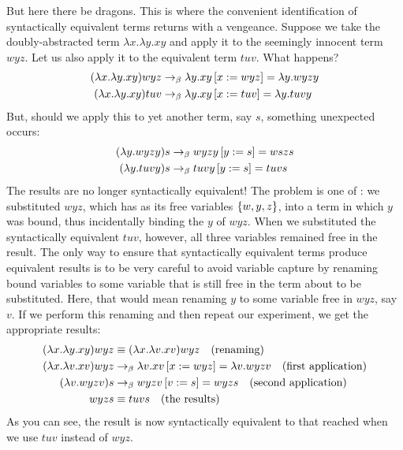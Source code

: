 But here there be dragons. This is where the convenient identification of syntactically equivalent terms returns with a vengeance. Suppose we take the doubly-abstracted term $\lambda x. \lambda y. xy$ and apply it to the seemingly innocent term $wyz$. Let us also apply it to the equivalent term $tuv$. What happens?
\begin{align*}
(\lambda x. \lambda y. xy) wyz &\betared \replace{x}{wyz}{\lambda y. xy} = \lambda y. wyzy
\\
(\lambda x. \lambda y. xy) tuv &\betared \replace{x}{tuv}{\lambda y. xy} = \lambda y. tuvy
\end{align*}
But, should we apply this to yet another term, say $s$, something unexpected occurs:
\begin{align*}
(\lambda y. wyzy) s &\betared \replace{y}{s}{wyzy} = wszs
\\
(\lambda y. tuvy) s &\betared \replace{y}{s}{tuvy} = tuvs
\end{align*}
The results are no longer syntactically equivalent! The problem is one of : we substituted $wyz$, which has as its free variables $\left\{ w, y, z \right\}$, into a term in which $y$ was bound, thus incidentally binding the $y$ of $wyz$. When we substituted the syntactically equivalent $tuv$, however, all three variables remained free in the result. The only way to ensure that syntactically equivalent terms produce equivalent results is to be very careful to avoid variable capture by renaming bound variables to some variable that is still free in the term about to be substituted. Here, that would mean renaming $y$ to some variable free in $wyz$, say $v$. If we perform this renaming and then repeat our experiment, we get the appropriate results:
\begin{align*}
(\lambda x. \lambda y. xy) wyz &\equiv (\lambda x. \lambda v. xv) wyz \quad \text{(renaming)}
\\
(\lambda x. \lambda v. xv) wyz &\betared \replace{x}{wyz}{\lambda v. xv} = \lambda v. wyzv
\quad \text{(first application)}
\\
(\lambda v. wyzv) s &\betared \replace{v}{s}{wyzv} = wyzs \quad \text{(second application)}
\\
wyzs &\equiv tuvs \quad \text{(the results)}
\end{align*}
As you can see, the result is now syntactically equivalent to that reached when we use $tuv$ instead of $wyz$.

